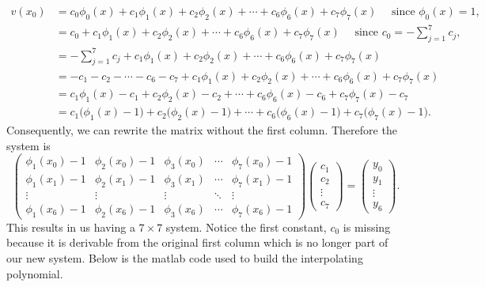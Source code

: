 \documentclass{article}
\begin{document}
\begin{enumerate}[label = {\arabic*}]
\begin{enumerate}
			\begin{align*}
				v(x_0) &= c_0\phi_0(x) + c_1\phi_1(x) + c_2\phi_2(x) + \cdots + c_6\phi_6(x) + c_7 \phi_7(x) \quad\text{ since } \phi_0(x) = 1, \\
				&= c_0 + c_1\phi_1(x) + c_2\phi_2(x) + \cdots + c_6\phi_6(x) + c_7 \phi_7(x) \quad\text{ since } c_0 = - \sum _{j = 1}^{7} c_j, \\
				&= - \sum_{j = 1}^{7} c_j + c_1\phi_1(x) + c_2\phi_2(x) + \cdots + c_6\phi_6(x) + c_7 \phi_7(x) \\
				&= -c_1 - c_2 - \cdots - c_6 - c_7 + c_1\phi_1(x) + c_2\phi_2(x) + \cdots + c_6\phi_6(x) + c_7 \phi_7(x) \\
				&= c_1\phi_1(x) - c_1 + c_2\phi_2(x) - c_2 + \cdots + c_6\phi_6(x) - c_6 + c_7 \phi_7(x) - c_7 \\
				&= c_1\Big(\phi_1(x) - 1\Big) + c_2\Big(\phi_2(x) - 1\Big) + \cdots + c_6\Big(\phi_6(x) - 1\Big) + c_7\Big(\phi_7(x) - 1\Big).
			\end{align*}
			Consequently, we can rewrite the matrix without the first column. Therefore the system is
			\[\begin{pmatrix}
				\phi_1(x_0) - 1 & \phi_2(x_0) - 1 & \phi_3(x_0) & \cdots & \phi_7(x_0) - 1 \\
				\phi_1(x_1) - 1 & \phi_2(x_1) - 1 & \phi_3(x_1) & \cdots & \phi_7(x_1) - 1 \\
				\vdots	        & \vdots	      & \vdots      & \ddots & \vdots 	   	   \\	
				\phi_1(x_6) - 1 & \phi_2(x_6) - 1 & \phi_3(x_6) & \cdots & \phi_7(x_6) - 1
			\end{pmatrix}
			\begin{pmatrix}
				c_1    \\
				c_2    \\
				\vdots \\
				c_7
			\end{pmatrix} =
			\begin{pmatrix}
				y_0    \\
				y_1    \\
				\vdots \\
				y_6
			\end{pmatrix}.\]
			This results in us having a $7 \times 7$ system. Notice the first constant, $c_0$ is missing because it is derivable from the original first column which is no longer part of our new system. Below is the matlab code used to build the interpolating polynomial.

			\pagebreak


\end{enumerate}
\end{enumerate}
\end{document}
